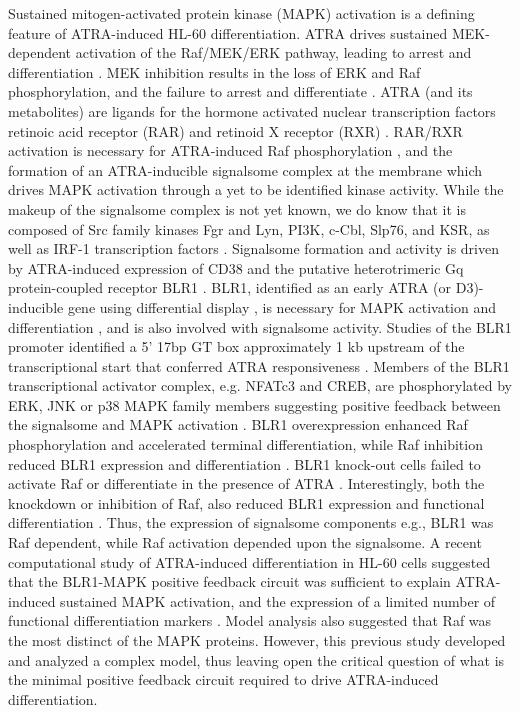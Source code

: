 \documentclass[12pt]{article}
\begin{document}
Sustained mitogen-activated protein kinase (MAPK) activation is a defining feature of ATRA-induced HL-60 differentiation.
ATRA drives sustained MEK-dependent activation of the Raf/MEK/ERK pathway, leading to arrest and differentiation \cite{Yen1998}.
MEK inhibition results in the loss of ERK and Raf phosphorylation, and the failure to arrest and differentiate \cite{Hong2001}.
ATRA (and its metabolites) are ligands for the hormone activated nuclear transcription factors retinoic acid receptor (RAR) and retinoid X receptor (RXR) \cite{Mangelsdorf1990}.
RAR/RXR activation is necessary for ATRA-induced Raf phosphorylation  \cite{Hong2001},
and the formation of an ATRA-inducible signalsome complex at the membrane which drives MAPK activation through a yet to be identified kinase activity.
While the makeup of the signalsome complex is not yet known,
we do know that it is composed of Src family kinases Fgr and Lyn, PI3K, c-Cbl, Slp76, and KSR, as well as IRF-1 transcription factors \cite{Congleton:2012fk,Shen:2011aa,Shen2009,Yen2006,Marchisio:1998aa}.
Signalsome formation and activity is driven by ATRA-induced expression of CD38 and the putative heterotrimeric Gq protein-coupled receptor BLR1 \cite{Congleton2011,WANG2004}.
BLR1, identified as an early ATRA (or D3)-inducible gene using differential display \cite{YEN1990},
is necessary for MAPK activation and differentiation \cite{WANG2004}, and is also involved with signalsome activity.
Studies of the BLR1 promoter identified a 5' 17bp GT box approximately 1 kb upstream of the transcriptional start that conferred ATRA responsiveness \cite{WANG2004}.
Members of the BLR1 transcriptional activator complex, e.g. NFATc3 and CREB,
are phosphorylated by ERK, JNK or p38 MAPK family members suggesting positive feedback between the signalsome and MAPK activation \cite{Yang2002}.
BLR1 overexpression enhanced Raf phosphorylation and accelerated terminal differentiation, while Raf inhibition reduced BLR1 expression and differentiation \cite{Wang2008}.
BLR1 knock-out cells failed to activate Raf or differentiate in the presence of ATRA \cite{Wang2008}.
Interestingly, both the knockdown or inhibition of Raf, also reduced BLR1 expression and functional differentiation \cite{Wang2008}.
Thus, the expression of signalsome components e.g., BLR1 was Raf dependent, while Raf activation depended upon the signalsome.
A recent computational study of ATRA-induced differentiation in HL-60 cells suggested that the BLR1-MAPK positive feedback circuit was sufficient
to explain ATRA-induced sustained MAPK activation, and the expression of a limited number of functional differentiation markers \cite{Tasseff2011}.
Model analysis also suggested that Raf was the most distinct of the MAPK proteins.
However, this previous study developed and analyzed a complex model,
thus leaving open the critical question of what is the minimal positive feedback circuit required to drive ATRA-induced differentiation.
\end{document}
